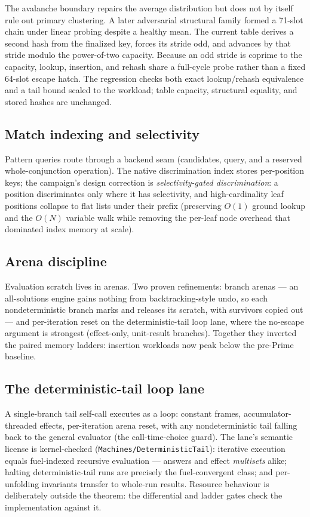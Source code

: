 \documentclass[11pt]{article}
\newcommand{\code}[1]{\texttt{#1}}
\begin{document}
The avalanche boundary repairs the average distribution but does not by
itself rule out primary clustering.  A later adversarial structural family
formed a 71-slot chain under linear probing despite a healthy mean.  The
current table derives a second hash from the finalized key, forces its stride
odd, and advances by that stride modulo the power-of-two capacity.  Because
an odd stride is coprime to the capacity, lookup, insertion, and rehash share
a full-cycle probe rather than a fixed 64-slot escape hatch.  The regression
checks both exact lookup/rehash equivalence and a tail bound scaled to the
workload; table capacity, structural equality, and stored hashes are
unchanged.

\subsection{Match indexing and selectivity}

Pattern queries route through a backend seam (candidates, query, and a
reserved whole-conjunction operation).  The native discrimination index
stores per-position keys; the campaign's design correction is
\emph{selectivity-gated discrimination}: a position discriminates only
where it has selectivity, and high-cardinality leaf positions collapse
to flat lists under their prefix (preserving $O(1)$ ground lookup and
the $O(N)$ variable walk while removing the per-leaf node overhead that
dominated index memory at scale).

\subsection{Arena discipline}

Evaluation scratch lives in arenas.  Two proven refinements: branch
arenas --- an all-solutions engine gains nothing from
backtracking-style undo, so each nondeterministic branch marks and
releases its scratch, with survivors copied out --- and per-iteration
reset on the deterministic-tail loop lane, where the no-escape argument
is strongest (effect-only, unit-result branches).  Together they
inverted the paired memory ladders: insertion workloads now peak below
the pre-Prime baseline.

\subsection{The deterministic-tail loop lane}

A single-branch tail self-call executes as a loop: constant frames,
accumulator-threaded effects, per-iteration arena reset, with any
nondeterministic tail falling back to the general evaluator (the
call-time-choice guard).  The lane's semantic license is
kernel-checked (\code{Machines/DeterministicTail}): iterative
execution equals fuel-indexed recursive evaluation --- answers and
effect \emph{multisets} alike; halting deterministic-tail runs are
precisely the fuel-convergent class; and per-unfolding invariants
transfer to whole-run results.  Resource behaviour is deliberately
outside the theorem: the differential and ladder gates check the
implementation against it.
\end{document}
